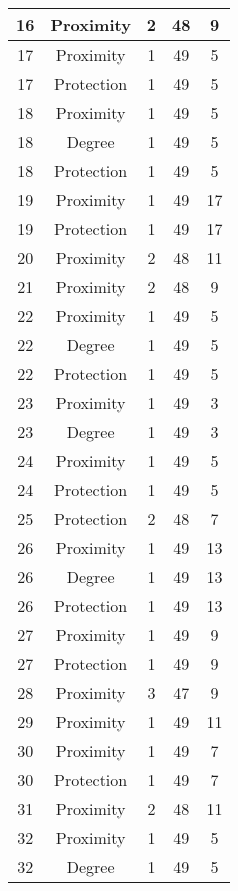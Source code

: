 \documentclass[results.tex]{subfiles}
\begin{document}
\begin{center}
\begin{tabular}{| c || c | c | c | c |}
    \hline
    16 & Proximity & 2 & 48 & 9 \\ 
    \hline
    17 & Proximity & 1 & 49 & 5 \\ 
    \hline
    17 & Protection & 1 & 49 & 5 \\ 
    \hline
    18 & Proximity & 1 & 49 & 5 \\ 
    \hline
    18 & Degree & 1 & 49 & 5 \\ 
    \hline
    18 & Protection & 1 & 49 & 5 \\ 
    \hline
    19 & Proximity & 1 & 49 & 17 \\ 
    \hline
    19 & Protection & 1 & 49 & 17 \\ 
    \hline
    20 & Proximity & 2 & 48 & 11 \\ 
    \hline
    21 & Proximity & 2 & 48 & 9 \\ 
    \hline
    22 & Proximity & 1 & 49 & 5 \\ 
    \hline
    22 & Degree & 1 & 49 & 5 \\ 
    \hline
    22 & Protection & 1 & 49 & 5 \\ 
    \hline
    23 & Proximity & 1 & 49 & 3 \\ 
    \hline
    23 & Degree & 1 & 49 & 3 \\ 
    \hline
    24 & Proximity & 1 & 49 & 5 \\ 
    \hline
    24 & Protection & 1 & 49 & 5 \\ 
    \hline
    25 & Protection & 2 & 48 & 7 \\ 
    \hline
    26 & Proximity & 1 & 49 & 13 \\ 
    \hline
    26 & Degree & 1 & 49 & 13 \\ 
    \hline
    26 & Protection & 1 & 49 & 13 \\ 
    \hline
    27 & Proximity & 1 & 49 & 9 \\ 
    \hline
    27 & Protection & 1 & 49 & 9 \\ 
    \hline
    28 & Proximity & 3 & 47 & 9 \\ 
    \hline
    29 & Proximity & 1 & 49 & 11 \\ 
    \hline
    30 & Proximity & 1 & 49 & 7 \\ 
    \hline
    30 & Protection & 1 & 49 & 7 \\ 
    \hline
    31 & Proximity & 2 & 48 & 11 \\ 
    \hline
    32 & Proximity & 1 & 49 & 5 \\ 
    \hline
    32 & Degree & 1 & 49 & 5 \\ 

\end{tabular}
\end{center}
\end{document}
